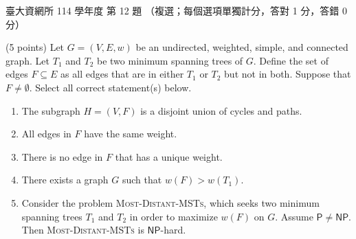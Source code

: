 \begin{pastexam}[label={px:ntu-114-dsa-12}]{臺大資網所 114 學年度 第 12 題}
（複選；每個選項單獨計分，答對 1 分，答錯 0 分）

(5 points) Let $G=(V,E,w)$ be an undirected, weighted, simple, and connected graph. Let $T_1$ and $T_2$ be two
minimum spanning trees of $G$. Define the set of edges $F\subseteq E$ as all edges that are in either $T_1$ or $T_2$
but not in both. Suppose that $F\neq\emptyset$. Select all correct statement(s) below.
\begin{enumerate}[label=(\Alph*)]
\item The subgraph $H=(V,F)$ is a disjoint union of cycles and paths.
\item All edges in $F$ have the same weight.
\item There is no edge in $F$ that has a unique weight.
\item There exists a graph $G$ such that $w(F)>w(T_1)$.
\item Consider the problem \textsc{Most-Distant-MSTs}, which seeks two minimum spanning trees $T_1$ and $T_2$ in
order to maximize $w(F)$ on $G$. Assume $\mathsf{P}\neq\mathsf{NP}$. Then \textsc{Most-Distant-MSTs} is
$\mathsf{NP}$-hard.
\end{enumerate}
\end{pastexam}

